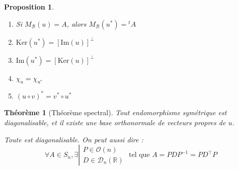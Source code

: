 \documentclass[11pt,a4paper]{report}
\newtheorem{itheorem}[theorem]{Théorème}
\newtheorem{prop}[theorem]{Proposition}
\theoremstyle{definition}
\begin{document}
\begin{prop}
    \renewcommand{\theenumi}{\roman{enumi}}%
    \begin{enumerate}
        \item Si $M_\mathcal{B}(u) = A$, alors $M_\mathcal{B}(u^*) = {}^tA$
        \item $\mathrm{Ker}(u^*) = \left[ \mathrm{Im}(u) \right]^\perp$
        \item $\mathrm{Im}(u^*) = \left[ \mathrm{Ker}(u) \right]^\perp$
        \item $\chi_u = \chi_{u^*}$
        \item $(u\circ v)^* = v^* \circ u^*$
    \end{enumerate}
\end{prop}
\begin{itheorem}[Théorème spectral]
    Tout \emph{endomorphisme symétrique} est diagonalisable, et il existe une base orthonormale de vecteurs propres de $u$.\par

    Toute  est diagonalisable. On peut aussi dire : 
    \begin{equation}
    \forall A \in S_n, \exists  \left| \begin{gathered} P \in \mathcal{O}(n) \\ D \in \mathcal{D}_n(\ensuremath{\mathbb{R}}) \end{gathered} \right. \text{ tel que } A = PDP^{-1} = PD{}^{\intercal}P
    \end{equation}
\end{itheorem}
\end{document}
